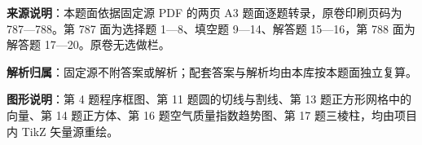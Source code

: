 

\begin{gknotice}
\textbf{来源说明}：本题面依据固定源 PDF 的两页 A3 题面逐题转录，原卷印刷页码为 787—788。第 787 面为选择题 1—8、填空题 9—14、解答题 15—16，第 788 面为解答题 17—20。原卷无选做栏。

\textbf{解析归属}：固定源不附答案或解析；配套答案与解析均由本库按本题面独立复算。

\textbf{图形说明}：第 4 题程序框图、第 11 题圆的切线与割线、第 13 题正方形网格中的向量、第 14 题正方体、第 16 题空气质量指数趋势图、第 17 题三棱柱，均由项目内 TikZ 矢量源重绘。
\end{gknotice}


